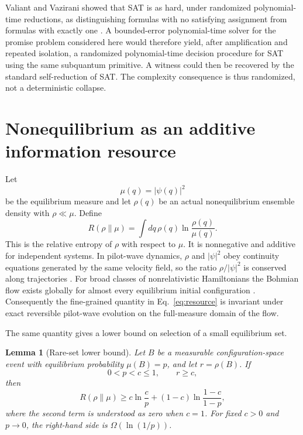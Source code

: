\documentclass[pdflatex,sn-mathphys-num]{sn-jnl}
\theoremstyle{thmstyleone}
\newtheorem{lemma}{Lemma}
\begin{document}
Valiant and Vazirani showed that SAT is as hard, under randomized polynomial-time reductions, as distinguishing formulas with no satisfying assignment from formulas with exactly one \cite{ValiantVazirani1986}. A bounded-error polynomial-time solver for the promise problem considered here would therefore yield, after amplification and repeated isolation, a randomized polynomial-time decision procedure for SAT using the same subquantum primitive. A witness could then be recovered by the standard self-reduction of SAT. The complexity consequence is thus randomized, not a deterministic collapse.

\section{Nonequilibrium as an additive information resource}

Let
\begin{equation}
\mu(q)=|\psi(q)|^2
\end{equation}
be the equilibrium measure and let $\rho(q)$ be an actual nonequilibrium ensemble density with $\rho\ll\mu$. Define
\begin{equation}
R(\rho\|\mu)
=\int dq\,\rho(q)\ln\frac{\rho(q)}{\mu(q)}.
\label{eq:resource}
\end{equation}
This is the relative entropy of $\rho$ with respect to $\mu$. It is nonnegative and additive for independent systems. In pilot-wave dynamics, $\rho$ and $|\psi|^2$ obey continuity equations generated by the same velocity field, so the ratio $\rho/|\psi|^2$ is conserved along trajectories \cite{Valentini1991,Valentini2025}. For broad classes of nonrelativistic Hamiltonians the Bohmian flow exists globally for almost every equilibrium initial configuration \cite{Berndl1995}. Consequently the fine-grained quantity in Eq.~\eqref{eq:resource} is invariant under exact reversible pilot-wave evolution on the full-measure domain of the flow.

The same quantity gives a lower bound on selection of a small equilibrium set.

\begin{lemma}[Rare-set lower bound]
Let $B$ be a measurable configuration-space event with equilibrium probability $\mu(B)=p$, and let $r=\rho(B)$. If
\begin{equation}
0<p<c\le 1,
\qquad r\ge c,
\end{equation}
then
\begin{equation}
R(\rho\|\mu)\ge
c\ln\frac{c}{p}+(1-c)\ln\frac{1-c}{1-p},
\label{eq:binarylower}
\end{equation}
where the second term is understood as zero when $c=1$. For fixed $c>0$ and $p\rightarrow0$, the right-hand side is $\Omega(\ln(1/p))$.
\end{lemma}
\end{document}
